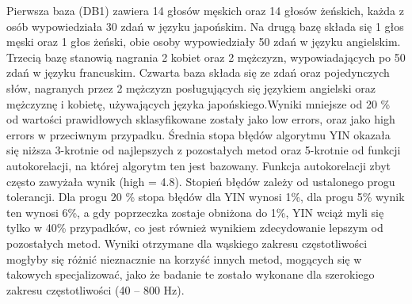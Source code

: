 \documentclass[a4paper,12 pt]{article}
\begin{document}
Pierwsza baza (DB1) zawiera 14 głosów męskich oraz 14 głosów żeńskich, każda z osób wypowiedziała 30 zdań w języku japońskim. Na drugą bazę składa się 1 głos męski oraz 1 głos żeński, obie osoby wypowiedziały 50 zdań w języku angielskim. Trzecią bazę stanowią nagrania 2 kobiet oraz 2 mężczyzn, wypowiadających po 50 zdań w języku francuskim. Czwarta baza składa się ze zdań oraz pojedynczych słów, nagranych przez 2 mężczyzn posługujących się językiem angielski oraz mężczyznę i kobietę, używających języka japońskiego.Wyniki mniejsze od 20 \% od wartości prawidłowych sklasyfikowane zostały jako low errors, oraz jako high errors w przeciwnym przypadku. Średnia stopa błędów algorytmu YIN okazała się niższa 3-krotnie od najlepszych z pozostałych metod oraz 5-krotnie od funkcji autokorelacji, na której algorytm ten jest bazowany. Funkcja autokorelacji zbyt często zawyżała wynik (high = 4.8). 
Stopień błędów zależy od ustalonego progu tolerancji. Dla progu 20 \% stopa błędów dla YIN wynosi 1\%, dla progu 5\% wynik ten wynosi 6\%, a gdy poprzeczka zostaje obniżona do 1\%, YIN wciąż myli się tylko w 40\% przypadków, co jest również wynikiem zdecydowanie lepszym od pozostałych metod.
Wyniki otrzymane dla wąskiego zakresu częstotliwości mogłyby się różnić nieznacznie na korzyść innych metod, mogących się w takowych specjalizować, jako że badanie te zostało wykonane dla szerokiego zakresu częstotliwości (40 – 800 Hz).
\end{document}
